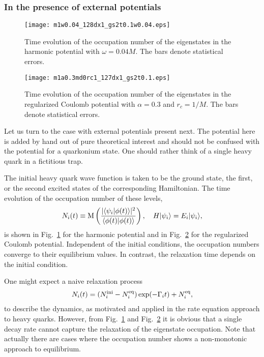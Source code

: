 \documentclass[prd,11pt, amsmath, amsymb, aps, reprint, tightenlines, nofootinbib, longbibliography, abbrv, preprintnumbers]{revtex4-1}
\begin{document}
\subsubsection{In the presence of external potentials}
\begin{figure}
\centering
\texttt{[image: m1w0.04\_128dx1\_gs2t0.1w0.04.eps]}
\caption{
Time evolution of the occupation number of the eigenstates in the harmonic potential with $\omega=0.04M$.
The bars denote statistical errors.
}
\label{fig:harmonic_evolution}
\end{figure}
\begin{figure}
\centering
\texttt{[image: m1a0.3md0rc1\_127dx1\_gs2t0.1.eps]}
\caption{
Time evolution of the occupation number of the eigenstates in the regularized Coulomb potential with $\alpha=0.3$ and $r_c=1/M$. 
The bars denote statistical errors.
}
\label{fig:coulomb_evolution}
\end{figure}

Let us turn to the case with external potentials present next.
The potential here is added by hand out of pure theoretical interest and should not be confused with the potential for a quarkonium state.
One should rather think of a single heavy quark in a fictitious trap.

The initial heavy quark wave function is taken to be the ground state, the first, or the second excited states of the corresponding Hamiltonian.
The time evolution of the occupation number of these levels,
\begin{align}
N_i(t)\equiv {\rm M}\left(\frac{|\langle \psi_i|\phi(t)\rangle|^2}{\langle\phi(t)|\phi(t)\rangle}\right), \quad
H|\psi_i\rangle = E_i|\psi_i\rangle,
\end{align}
is shown in Fig.~\ref{fig:harmonic_evolution} for the harmonic potential and in Fig.~\ref{fig:coulomb_evolution} for the regularized Coulomb potential.
Independent of the initial conditions, the occupation numbers converge to their equilibrium values.
In contrast, the relaxation time depends on the initial condition.

One might expect a naive relaxation process
\begin{align}
N_i(t) = (N_i^{\rm ini}-N_i^{\rm eq})\exp(-\Gamma_i t) + N_i^{\rm eq},
\end{align}
to describe the dynamics, as motivated and applied in the rate equation approach to heavy quarks.
However, from Fig.~\ref{fig:harmonic_evolution} and Fig.~\ref{fig:coulomb_evolution} it is obvious that a single decay rate cannot capture the relaxation of the eigenstate occupation.
Note that actually there are cases where the occupation number shows a non-monotonic approach to equilibrium.
\end{document}
